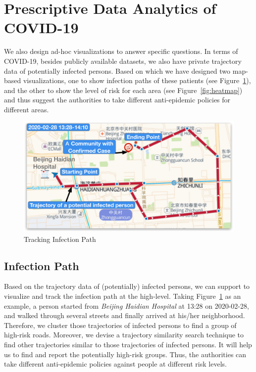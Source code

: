 \section{Prescriptive Data Analytics of COVID-19}
\label{sec:prescriptive}


We also design ad-hoc visualizations to answer specific questions. In terms of COVID-19, besides publicly available datasets, we also have private trajectory data of potentially infected persons. Based on which we have designed two map-based visualizations, one to show infection paths of these patients (see Figure~\ref{fig:infection}), and the other to show the level of risk for each area (see Figure~\ref{fig:heatmap}) and thus suggest the authorities to take different anti-epidemic policies for different areas.


\begin{figure}[t!]
	\vspace{-.5em}
	\centering
	\includegraphics[width=.65\columnwidth]{figs/InfectionPath.pdf} 
	\caption{Tracking Infection Path}
	\label{fig:infection}
\end{figure}

\subsection{Infection Path}
Based on the trajectory data of (potentially) infected persons, we can support to visualize and track the infection path at the high-level. Taking Figure~\ref{fig:infection} as an example, a person started from {\em Beijing Haidian Hospital} at 13:28 on 2020-02-28, and walked through several streets and finally arrived at his/her neighborhood. Therefore, we cluster those trajectories of infected persons to find a group of high-risk roads. 
%
Moreover, we devise a trajectory similarity search technique to find other trajectories similar to those trajectories of infected persons. It will help us to find and report the potentially high-risk groups. 
Thus, the authorities can take different anti-epidemic policies against people at different risk levels.

